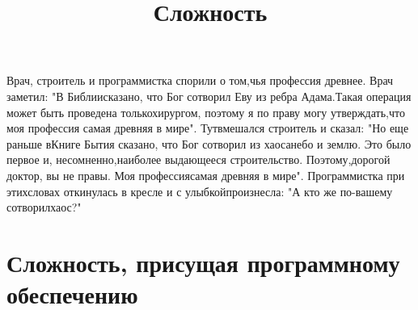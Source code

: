 \documentclass[10pt]{article}
\author{}
\date{}
\begin{document}
\title{\bf Сложность}
\maketitle
\thispagestyle{empty}
\begin{flushright}
\begin{minipage}{0.47\hsize}
\small
Врач, строитель и программистка спорили о том,\linebreak чья профессия древнее. Врач заметил: "В Библии\linebreak сказано, что Бог сотворил Еву из ребра Адама.\linebreak Такая операция может быть проведена только\linebreak хирургом, поэтому я по праву могу утверждать,\linebreak что моя профессия самая древняя в мире". Тут\linebreak вмешался строитель и сказал: "Но еще раньше в\linebreak Книге Бытия сказано, что Бог сотворил из хаоса\linebreak небо и землю. Это было первое и, несомненно,\linebreak наиболее выдающееся строительство. Поэтому,\linebreak дорогой доктор, вы не правы. Моя профессия\linebreak самая древняя в мире". Программистка при этих\linebreak словах откинулась в кресле и с улыбкой\linebreak произнесла: "А кто же по-вашему сотворил\linebreak хаос?"\linebreak
\end{minipage}
\end{flushright}

\section{Сложность, присущая программному обеспечению}
\end{document}
